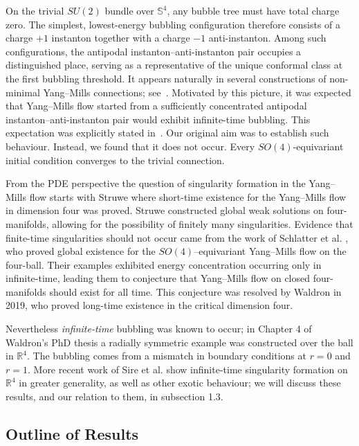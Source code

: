 \documentclass[11pt,a4paper]{article}
\numberwithin{equation}{section}
\theoremstyle{plain}
\theoremstyle{remark}
\begin{document}
On the trivial $SU(2)$ bundle over $\mathbb S^4$, any bubble tree must have total charge zero. The simplest, lowest-energy bubbling configuration therefore consists of a charge $+1$ instanton together with a charge $-1$ anti-instanton. Among such configurations, the antipodal instanton--anti-instanton pair occupies a distinguished place, serving as a representative of the unique conformal class at the first bubbling threshold. It appears naturally in several constructions of non-minimal Yang--Mills connections; see~\cite{Parker1992NonMinimal,SibnerSibnerUhlenbeck1989,Wang1997MorseYM}. Motivated by this picture, it was expected that Yang–Mills flow started from a sufficiently concentrated antipodal instanton--anti-instanton pair would exhibit infinite-time bubbling. This expectation was explicitly stated in~\cite{Wang1997MorseYM,Sadun1994SymmetricFamily}. Our original aim was to establish such behaviour. Instead, we found that it does not occur. Every $SO(4)$-equivariant initial condition converges to the trivial connection.

From the PDE perspective the question of singularity formation in the Yang--Mills flow starts with Struwe \cite{struwe1994yangmills} where short-time existence for the Yang--Mills flow in dimension four was proved. Struwe constructed global weak solutions on four-manifolds, allowing for the possibility of finitely many singularities. Evidence that finite-time singularities should not occur came from the work of Schlatter et al. \cite{67fa8f92-32f2-39c3-bd3f-c407da60a7c7}, who proved global existence for the $SO(4)$--equivariant Yang--Mills flow on the four-ball. Their examples exhibited energy concentration occurring only in infinite-time, leading them to conjecture that Yang--Mills flow on closed four-manifolds should exist for all time. This conjecture was resolved by Waldron \cite{Waldron2019} in 2019, who proved long-time existence in the critical dimension four.

Nevertheless \emph{infinite-time} bubbling was known to occur; in Chapter 4 of Waldron's PhD thesis a radially symmetric example was constructed over the ball in $\mathbb{R}^4$. The bubbling comes from a mismatch in boundary conditions at $r=0$ and $r=1$. More recent work of  Sire et al. \cite{SireWeiZheng2022, sire2026globaloscillatorysolutionsyangmills} show infinite-time singularity formation on $\mathbb R^4$ in greater generality, as well as other exotic behaviour; we will discuss these results, and our relation to them, in subsection 1.3. 


\subsection{Outline of Results}
\end{document}
